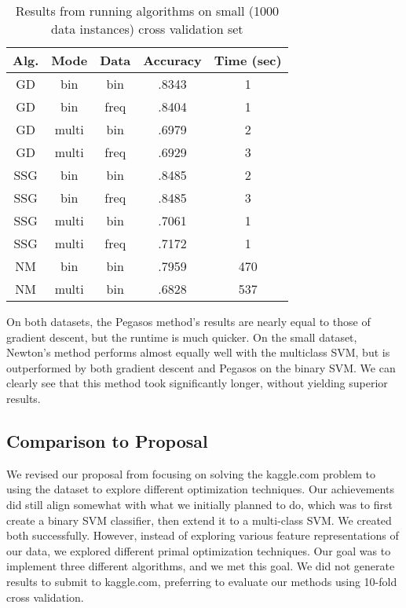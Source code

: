 \documentclass[letterpaper, 11pt]{article}
\begin{document}
\begin{table}
\centering
\begin{tabular}{c|cccc}
\textbf{Alg.} & \textbf{Mode} & \textbf{Data} & \textbf{Accuracy} & \textbf{Time (sec)}\\
\hline
GD & bin & bin &  .8343 & 1\\
GD & bin & freq & .8404 & 1\\
GD & multi & bin & .6979 & 2\\
GD & multi & freq & .6929 & 3\\
SSG & bin & bin & .8485 & 2\\
SSG & bin & freq & .8485 & 3\\
SSG & multi & bin & .7061 & 1\\
SSG & multi & freq & .7172 & 1\\
NM & bin & bin & .7959 & 470 \\
NM & multi & bin & .6828 & 537 \\
\end{tabular}
\caption{Results from running algorithms on small (1000 data instances) cross validation set}\label{table:smallset}
\end{table}

On both datasets, the Pegasos method's results are nearly equal to those of gradient descent, but the runtime is much quicker.  On the small dataset, Newton's method performs almost equally well with the multiclass SVM, but is outperformed by both gradient descent and Pegasos on the binary SVM.  We can clearly see that this method took significantly longer, without yielding superior results.

\subsection{Comparison to Proposal}
We revised our proposal from focusing on solving the kaggle.com problem to using the dataset to explore different optimization techniques.  Our achievements did still align somewhat with what we initially planned to do, which was to first create a binary SVM classifier, then extend it to a multi-class SVM.  We created both successfully.  However, instead of exploring various feature representations of our data, we explored different primal optimization techniques.  Our goal was to implement three different algorithms, and we met this goal.  We did not generate results to submit to kaggle.com, preferring to evaluate our methods using 10-fold cross validation. 



\nocite{*}
 

\end{document}
